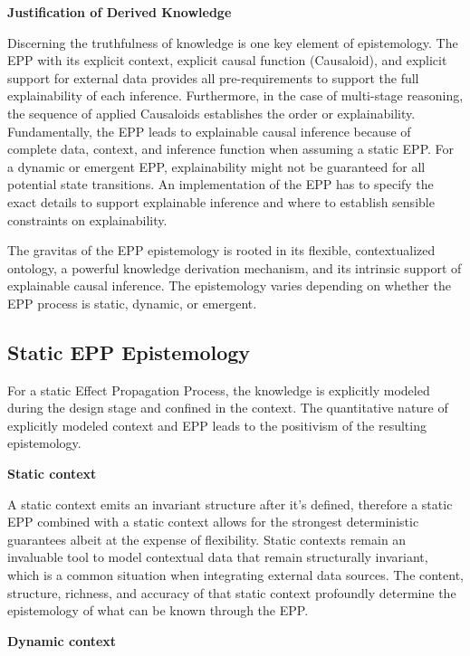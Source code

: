 \documentclass{article}
\begin{document}
\textbf{Justification of Derived Knowledge}

Discerning the truthfulness of knowledge is one key element of epistemology. The EPP with its explicit context, explicit causal function (Causaloid), and explicit support for external data provides all pre-requirements to support the full explainability of each inference. Furthermore, in the case of multi-stage reasoning, the sequence of applied Causaloids establishes the order or explainability.
Fundamentally, the EPP leads to explainable causal inference because of complete data, context, and inference function when assuming a static EPP. For a dynamic or emergent EPP, explainability might not be guaranteed for all potential state transitions. An implementation of the EPP has to specify the exact details to support explainable inference and where to establish sensible constraints on explainability.

The gravitas of the EPP epistemology is rooted in its flexible, contextualized ontology, a powerful knowledge derivation mechanism, and its intrinsic support of explainable causal inference. The epistemology varies depending on whether the EPP process is static, dynamic, or emergent.

\newpage

\subsection{Static EPP Epistemology}

For a static Effect Propagation Process, the knowledge is explicitly modeled during the design stage and confined in the context. The quantitative nature of explicitly modeled context and EPP leads to the positivism of the resulting epistemology.

\textbf{Static context}

A static context emits an invariant structure after it's defined, therefore a static EPP combined with a static context allows for the strongest deterministic guarantees albeit at the expense of flexibility. Static contexts remain an invaluable tool to model contextual data that remain structurally invariant, which is a common situation when integrating external data sources. The content, structure, richness, and accuracy of that static context profoundly determine the epistemology of what can be known through the EPP.

\textbf{Dynamic context}
\end{document}
